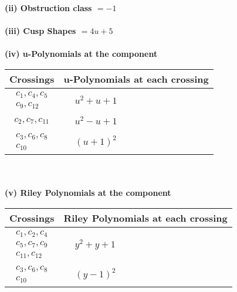 \documentclass[1p]{elsarticle_modified}
\theoremstyle{definition}
\begin{document}
\flushleft \textbf{(ii) Obstruction class $= -1$}\\~\\
\flushleft \textbf{(iii) Cusp Shapes $= 4 u+5$}\\~\\
\newpage\renewcommand{\arraystretch}{1}
\flushleft \textbf{(iv) u-Polynomials at the component}\newline \\
\begin{tabular}{m{50pt}|m{274pt}}
Crossings & \hspace{64pt}u-Polynomials at each crossing \\
\hline $$\begin{aligned}c_{1},c_{4},c_{5}\\c_{9},c_{12}\end{aligned}$$&$\begin{aligned}
&u^2+u+1
\end{aligned}$\\
\hline $$\begin{aligned}c_{2},c_{7},c_{11}\end{aligned}$$&$\begin{aligned}
&u^2- u+1
\end{aligned}$\\
\hline $$\begin{aligned}c_{3},c_{6},c_{8}\\c_{10}\end{aligned}$$&$\begin{aligned}
&(u+1)^2
\end{aligned}$\\
\hline
\end{tabular}\\~\\
\newpage\renewcommand{\arraystretch}{1}
\flushleft \textbf{(v) Riley Polynomials at the component}\newline \\
\begin{tabular}{m{50pt}|m{274pt}}
Crossings & \hspace{64pt}Riley Polynomials at each crossing \\
\hline $$\begin{aligned}c_{1},c_{2},c_{4}\\c_{5},c_{7},c_{9}\\c_{11},c_{12}\end{aligned}$$&$\begin{aligned}
&y^2+y+1
\end{aligned}$\\
\hline $$\begin{aligned}c_{3},c_{6},c_{8}\\c_{10}\end{aligned}$$&$\begin{aligned}
&(y-1)^2
\end{aligned}$\\
\hline
\end{tabular}\\~\\
\end{document}
